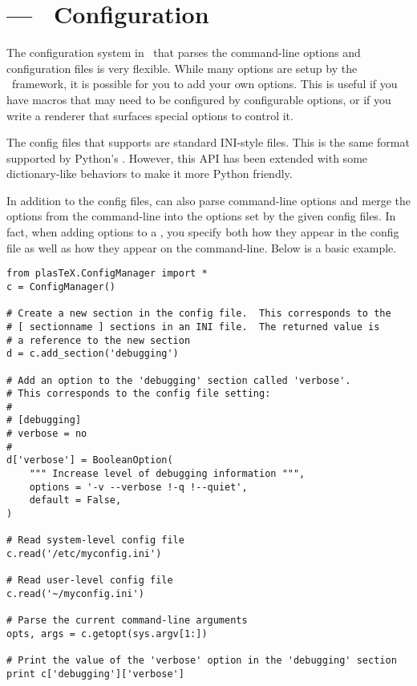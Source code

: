 
\section{ --- \plasTeX\ Configuration}
\label{sec:configuration-api}


The configuration system in \plasTeX\ that parses the command-line options
and configuration files is very flexible.  While many options are setup
by the \plasTeX\ framework, it is possible for you to add your own options.
This is useful if you have macros that may need to be configured by 
configurable options, or if you write a renderer that surfaces special options
to control it.

The config files that  supports are standard INI-style
files.  This is the same format supported by Python's .
However, this API has been extended with some dictionary-like behaviors
to make it more Python friendly.

In addition to the config files,  can also parse
command-line options and merge the options from the command-line into
the options set by the given config files.  In fact, when adding options
to a , you specify both how they appear in the config
file as well as how they appear on the command-line.  Below is a basic 
example.

\begin{verbatim}
from plasTeX.ConfigManager import *
c = ConfigManager()

# Create a new section in the config file.  This corresponds to the
# [ sectionname ] sections in an INI file.  The returned value is 
# a reference to the new section
d = c.add_section('debugging')

# Add an option to the 'debugging' section called 'verbose'.
# This corresponds to the config file setting:
#
# [debugging]
# verbose = no
#
d['verbose'] = BooleanOption(
    """ Increase level of debugging information """,
    options = '-v --verbose !-q !--quiet',
    default = False,
)

# Read system-level config file
c.read('/etc/myconfig.ini')

# Read user-level config file
c.read('~/myconfig.ini')

# Parse the current command-line arguments
opts, args = c.getopt(sys.argv[1:])

# Print the value of the 'verbose' option in the 'debugging' section
print c['debugging']['verbose']
\end{verbatim}

